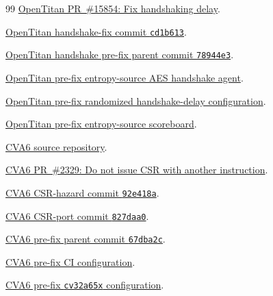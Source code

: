 \documentclass[conference]{IEEEtran}
\begin{document}
\begin{thebibliography}{99}
\href{https://github.com/lowRISC/opentitan/pull/15854}{OpenTitan PR~\#15854: Fix handshaking delay}.

\href{https://github.com/lowRISC/opentitan/commit/cd1b6131548f8bdb86e2f10904d0b8551db31d50}{OpenTitan handshake-fix commit \texttt{cd1b613}}.

\href{https://github.com/lowRISC/opentitan/commit/78944e3d4b0af31133ccca88395de4a74d0c6b8b}{OpenTitan handshake pre-fix parent commit \texttt{78944e3}}.

\href{https://github.com/lowRISC/opentitan/blob/78944e3d4b0af31133ccca88395de4a74d0c6b8b/hw/ip/entropy_src/dv/env/entropy_src_env.sv}{OpenTitan pre-fix entropy-source AES handshake agent}.

\href{https://github.com/lowRISC/opentitan/blob/78944e3d4b0af31133ccca88395de4a74d0c6b8b/hw/dv/sv/push_pull_agent/push_pull_agent_cfg.sv}{OpenTitan pre-fix randomized handshake-delay configuration}.

\href{https://github.com/lowRISC/opentitan/blob/78944e3d4b0af31133ccca88395de4a74d0c6b8b/hw/ip/entropy_src/dv/env/entropy_src_scoreboard.sv}{OpenTitan pre-fix entropy-source scoreboard}.

\href{https://github.com/openhwfoundation/cva6}{CVA6 source repository}.

\href{https://github.com/openhwfoundation/cva6/pull/2329}{CVA6 PR~\#2329: Do not issue CSR with another instruction}.

\href{https://github.com/openhwfoundation/cva6/commit/92e418a507134ef4cb95925feba4a72ff7f845cb}{CVA6 CSR-hazard commit \texttt{92e418a}}.

\href{https://github.com/openhwfoundation/cva6/commit/827daa09f413950e28e4f4cb84843e9d8e41a4c5}{CVA6 CSR-port commit \texttt{827daa0}}.

\href{https://github.com/openhwfoundation/cva6/commit/67dba2cad376de0190bb5564f1e229de73e86ef1}{CVA6 pre-fix parent commit \texttt{67dba2c}}.

\href{https://github.com/openhwfoundation/cva6/blob/67dba2cad376de0190bb5564f1e229de73e86ef1/.gitlab-ci.yml}{CVA6 pre-fix CI configuration}.

\href{https://github.com/openhwfoundation/cva6/blob/67dba2cad376de0190bb5564f1e229de73e86ef1/core/include/cv32a65x_config_pkg.sv}{CVA6 pre-fix \texttt{cv32a65x} configuration}.


\end{thebibliography}
\end{document}
